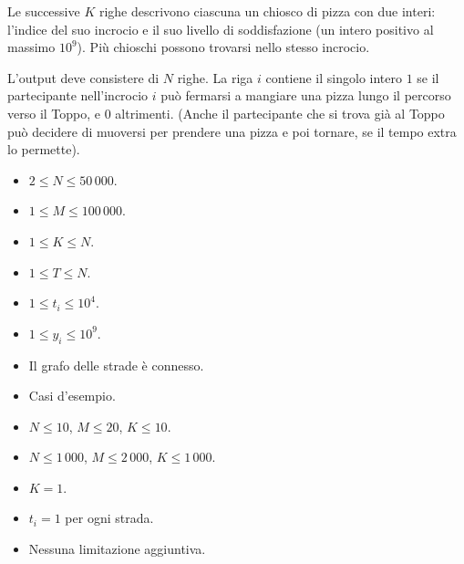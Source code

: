 Le successive $K$ righe descrivono ciascuna un chiosco di pizza con due interi: l'indice del suo incrocio e il suo livello di soddisfazione (un intero positivo al massimo $10^9$). Più chioschi possono trovarsi nello stesso incrocio.

\OutputFile
L'output deve consistere di $N$ righe. La riga $i$ contiene il singolo intero $1$ se il partecipante nell'incrocio $i$ può fermarsi a mangiare una pizza lungo il percorso verso il Toppo, e $0$ altrimenti. (Anche il partecipante che si trova già al Toppo può decidere di muoversi per prendere una pizza e poi tornare, se il tempo extra lo permette).

\Constraints
\begin{itemize}
    \item $2 \le N \le 50\,000$.
    \item $1 \le M \le 100\,000$.
    \item $1 \le K \le N$.
    \item $1 \le T \le N$.
    \item $1 \le t_i \le 10^4$.
    \item $1 \le y_i \le 10^9$.
    \item Il grafo delle strade è connesso.
\end{itemize}

\Scoring
\begin{itemize}
    \item \subtask Casi d'esempio.
    \item \subtask $N \le 10$, $M \le 20$, $K \le 10$.
    \item \subtask $N \le 1\,000$, $M \le 2\,000$, $K \le 1\,000$.
    \item \subtask $K = 1$.
    \item \subtask $t_i = 1$ per ogni strada.
    \item \subtask Nessuna limitazione aggiuntiva.
\end{itemize}

\Examples
\begin{example}
\end{example}


